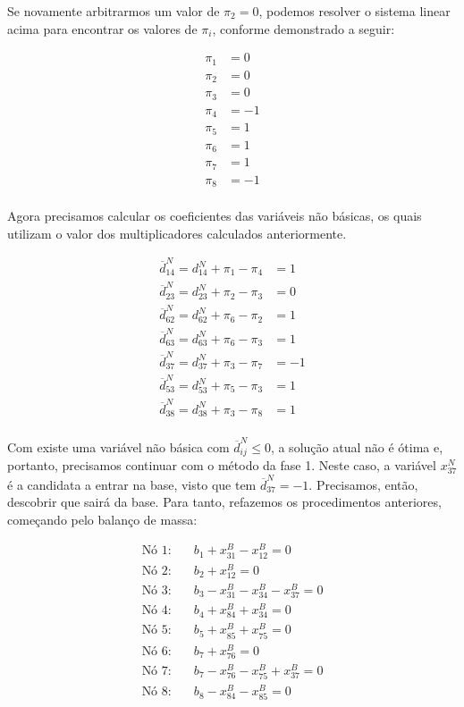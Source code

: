 \documentclass{article}
\begin{document}
Se novamente arbitrarmos um valor de $\pi_{2} = 0$, podemos resolver o sistema linear acima para encontrar os valores de $\pi_{i}$, conforme demonstrado a seguir:

\begin{align*}
    \pi_{1} &= 0 \\
    \pi_{2} &= 0 \\
    \pi_{3} &= 0 \\
    \pi_{4} &= -1 \\
    \pi_{5} &= 1 \\
    \pi_{6} &= 1 \\
    \pi_{7} &= 1 \\
    \pi_{8} &= -1 \\
\end{align*}

Agora precisamos calcular os coeficientes das variáveis não básicas, os quais utilizam o valor dos multiplicadores calculados anteriormente.

\begin{align*}
    \overline{d}^{N}_{14} = d^{N}_{14} + \pi_{1} - \pi_{4} &=  1 \\
    \overline{d}^{N}_{23} = d^{N}_{23} + \pi_{2} - \pi_{3} &=  0 \\
    \overline{d}^{N}_{62} = d^{N}_{62} + \pi_{6} - \pi_{2} &=  1 \\
    \overline{d}^{N}_{63} = d^{N}_{63} + \pi_{6} - \pi_{3} &=  1 \\
    \overline{d}^{N}_{37} = d^{N}_{37} + \pi_{3} - \pi_{7} &= -1 \\
    \overline{d}^{N}_{53} = d^{N}_{53} + \pi_{5} - \pi_{3} &=  1 \\
    \overline{d}^{N}_{38} = d^{N}_{38} + \pi_{3} - \pi_{8} &=  1 \\
\end{align*}

Com existe uma variável não básica com $\overline{d}^{N}_{ij} \leq 0$, a solução atual não é ótima e, portanto, precisamos continuar com o método da fase 1.
Neste caso, a variável $x^{N}_{37}$ é a candidata a entrar na base, visto que tem $\overline{d}^{N}_{37} = -1$.
Precisamos, então, descobrir que sairá da base.
Para tanto, refazemos os procedimentos anteriores, começando pelo balanço de massa:

\begin{align}
    \text{Nó 1:} & \quad b_{1} + x^{B}_{31} - x^{B}_{12} = 0 \\
    \text{Nó 2:} & \quad b_{2} + x^{B}_{12} = 0 \\
    \text{Nó 3:} & \quad b_{3} - x^{B}_{31} - x^{B}_{34} - x^{B}_{37} = 0 \\
    \text{Nó 4:} & \quad b_{4} + x^{B}_{84} + x^{B}_{34} = 0 \\
    \text{Nó 5:} & \quad b_{5} + x^{B}_{85} + x^{B}_{75} = 0 \\
    \text{Nó 6:} & \quad b_{7} + x^{B}_{76} = 0 \\
    \text{Nó 7:} & \quad b_{7} - x^{B}_{76} - x^{B}_{75} + x^{B}_{37} = 0 \\
    \text{Nó 8:} & \quad b_{8} - x^{B}_{84} - x^{B}_{85} = 0
\end{align}
\end{document}
